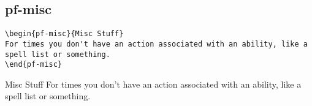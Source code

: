 \begin{multicols}{2}
\subsection{pf-misc}
\begin{verbatim}
\begin{pf-misc}{Misc Stuff}
For times you don't have an action associated with an ability, like a spell list or something.
\end{pf-misc}
\end{verbatim}
\begin{pf-misc}{Misc Stuff}
For times you don't have an action associated with an ability, like a spell list or something.
\end{pf-misc}



\end{multicols}

